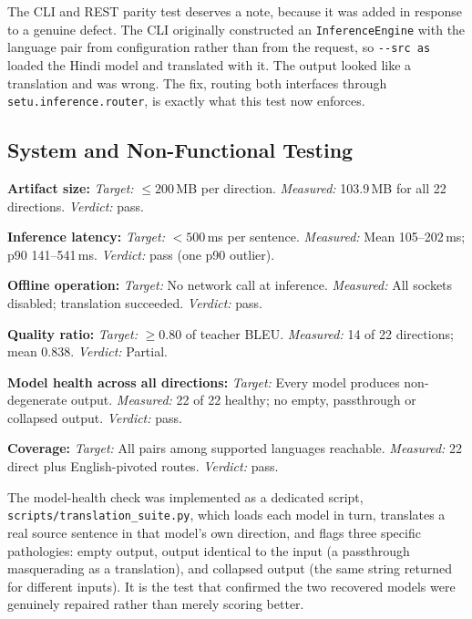 The CLI and REST parity test deserves a note, because it was added in response
to a genuine defect. The
CLI originally constructed an \texttt{InferenceEngine} with the language pair
from configuration rather than from the request, so \texttt{-{}-src as} loaded
the Hindi model and translated with it. The output looked like a translation and
was wrong. The fix, routing both interfaces through
\texttt{setu.inference.router}, is exactly what this test now enforces.

\subsection{System and Non-Functional Testing}
\label{subsec:systemtest}

\begin{bullets}
\item \textbf{Artifact size:} \emph{Target:} $\leq 200$\,MB per direction. \emph{Measured:} 103.9\,MB for all 22 directions. \emph{Verdict:} pass.
\item \textbf{Inference latency:} \emph{Target:} $<500$\,ms per sentence. \emph{Measured:} Mean 105--202\,ms; p90 141--541\,ms. \emph{Verdict:} pass (one p90 outlier).
\item \textbf{Offline operation:} \emph{Target:} No network call at inference. \emph{Measured:} All sockets disabled; translation succeeded. \emph{Verdict:} pass.
\item \textbf{Quality ratio:} \emph{Target:} $\geq 0.80$ of teacher BLEU. \emph{Measured:} 14 of 22 directions; mean 0.838. \emph{Verdict:} Partial.
\item \textbf{Model health across all directions:} \emph{Target:} Every model produces non-degenerate output. \emph{Measured:} 22 of 22 healthy; no empty, passthrough or collapsed output. \emph{Verdict:} pass.
\item \textbf{Coverage:} \emph{Target:} All pairs among supported languages reachable. \emph{Measured:} 22 direct plus English-pivoted routes. \emph{Verdict:} pass.
\end{bullets}

The model-health check was implemented as a dedicated script, \texttt{scripts/translation\_suite.py},
which loads each model in turn, translates a real source sentence in that
model's own direction, and flags three specific pathologies: empty output,
output identical to the input (a passthrough masquerading as a translation), and
collapsed output (the same string returned for different inputs). It is the test
that confirmed the two recovered models were genuinely repaired rather than
merely scoring better.


